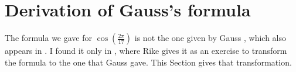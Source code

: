 \documentclass[11pt,a4paper]{article}
\newenvironment{form}[1]{%
\begin{displaymath}%
\renewcommand{\arraystretch}{#1}%
\begin{array}{lcl}}%
{\end{array}%
\end{displaymath}%
}
\newcommand*{\disfrac}[2]{\displaystyle\frac{#1}{#2}}
\begin{document}
\clearpage

\section{Derivation of Gauss's formula}\label{s.derivation}

The formula we gave for $\cos\left(\disfrac{2\pi}{17}\right)$ is not the one given by Gauss \cite[p.~458]{gauss}, which also appears in \cite[p.~68]{jorg}. I found it only in \cite{rike}, where Rike gives it as an exercise to transform the formula to the one that Gauss gave. This Section gives that transformation.
\end{document}
